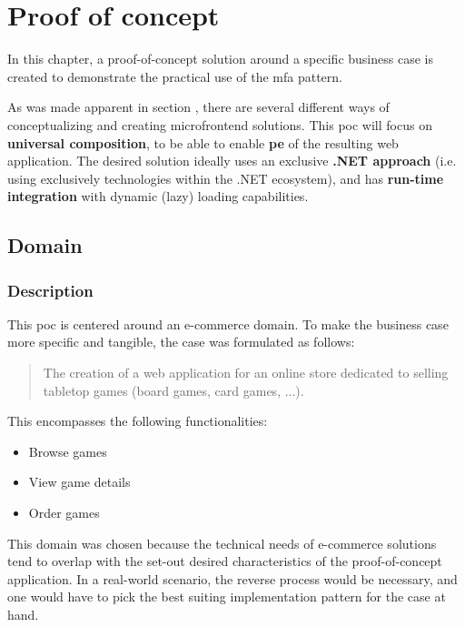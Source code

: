 
\chapter{Proof of concept}
\label{ch:proof-of-concept}

In this chapter, a proof-of-concept solution around a specific business case is
created to demonstrate the practical use of the \gls{mfa} pattern.

As was made apparent in section , there
are several different ways of conceptualizing and creating \gls{microfrontend}
solutions. This \gls{poc} will focus on \textbf{universal composition}, to be
able to enable \textbf{\gls{pe}} of the resulting web application. The desired
solution ideally uses an exclusive \textbf{.NET approach} (i.e. using
exclusively technologies within the .NET ecosystem), and has \textbf{run-time
integration} with dynamic (lazy) loading capabilities.


\section{Domain}
\subsection{Description}

This \gls{poc} is centered around an e-commerce domain. To make the
business case more specific and tangible, the case was formulated as
follows:

\begin{quote}
  The creation of a web application for an online store dedicated to selling
  tabletop games (board games, card games, ...).
\end{quote}

This encompasses the following functionalities:
\begin{itemize}
  \item Browse games
  \item View game details
  \item Order games
\end{itemize}

This domain was chosen because the technical needs of e-commerce solutions tend
to overlap with the set-out desired characteristics of the proof-of-concept
application. In a real-world scenario, the reverse process would be necessary,
and one would have to  pick the best suiting implementation pattern for the case
at hand. 

